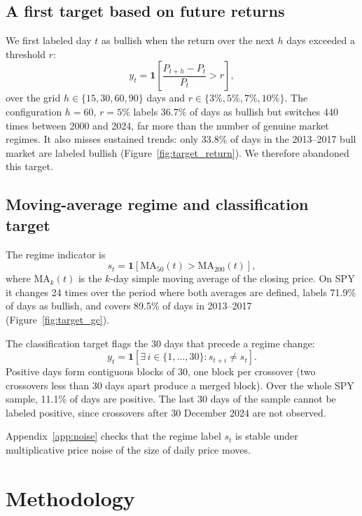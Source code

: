 \documentclass[11pt,a4paper]{article}
\newcommand{\ind}{\mathbf{1}}
\begin{document}
\subsection{A first target based on future returns}

We first labeled day $t$ as bullish when the return over the next $h$ days exceeded a threshold $r$:
\begin{equation}
  y_t = \ind\left[\frac{P_{t+h}-P_t}{P_t} > r\right],
\end{equation}
over the grid $h\in\{15,30,60,90\}$ days and $r\in\{3\%,5\%,7\%,10\%\}$. The configuration
$h=60$, $r=5\%$ labels 36.7\% of days as bullish but switches 440 times between 2000 and 2024,
far more than the number of genuine market regimes. It also misses sustained trends: only 33.8\%
of days in the 2013--2017 bull market are labeled bullish (Figure~\ref{fig:target_return}).
We therefore abandoned this target.

\subsection{Moving-average regime and classification target}

The regime indicator is
\begin{equation}
  s_t = \ind\left[\mathrm{MA}_{50}(t) > \mathrm{MA}_{200}(t)\right],
\end{equation}
where $\mathrm{MA}_k(t)$ is the $k$-day simple moving average of the closing price. On SPY it
changes 24 times over the period where both averages are defined, labels 71.9\% of days as
bullish, and covers 89.5\% of days in 2013--2017 (Figure~\ref{fig:target_gc}).

The classification target flags the 30 days that precede a regime change:
\begin{equation}
  y_t = \ind\left[\exists\, i\in\{1,\dots,30\} : s_{t+i} \neq s_t\right].
  \label{eq:target}
\end{equation}
Positive days form contiguous blocks of 30, one block per crossover (two crossovers less than
30 days apart produce a merged block). Over the whole SPY sample, 11.1\% of days are positive.
The last 30 days of the sample cannot be labeled positive, since crossovers after
30 December 2024 are not observed.

Appendix~\ref{app:noise} checks that the regime label $s_t$ is stable under multiplicative price
noise of the size of daily price moves.

\section{Methodology}\label{sec:method}
\end{document}
